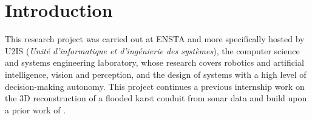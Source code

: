 \section{Introduction}                   %
\label{sec:introduction}                 %

This research project was carried out at ENSTA and more specifically hosted by U2IS (\emph{Unit\'e d'informatique et
d'ing\'enierie des syst\`emes}), the computer science and systems engineering laboratory, whose research covers robotics and artificial intelligence, vision and
perception, and the design of systems with a high level of decision-making autonomy. This project continues a previous internship work on the 3D reconstruction \citep{margaritis2025internship} of a flooded karst conduit
from sonar data and build upon a prior work of \citep{breux2020elevation}. 



